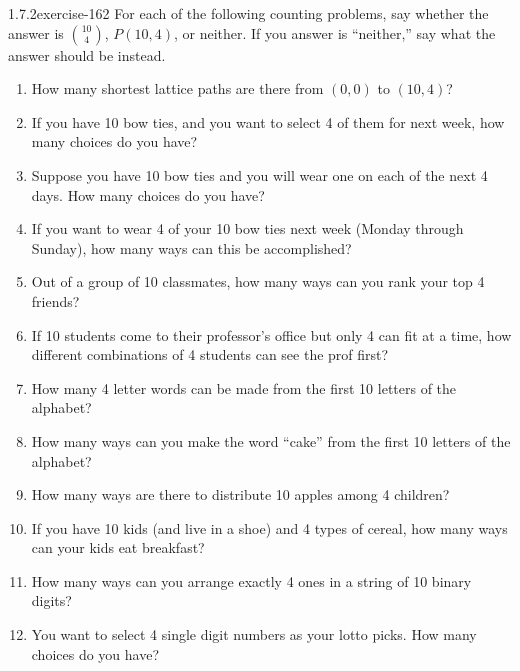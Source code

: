 \documentclass[twoside,11pt,]{book}
\numberwithin{equation}{chapter}
\begin{document}
\begin{divisionsolution}{1.7.2}{}{exercise-162}%
\hypertarget{p-2626}{}%
For each of the following counting problems, say whether the answer is \({10\choose 4}\), \(P(10,4)\), or neither. If you answer is ``neither,'' say what the answer should be instead.\leavevmode%
\begin{enumerate}[label=(\alph*)]
\item\hypertarget{li-1540}{}\hypertarget{p-2627}{}%
How many shortest lattice paths are there from \((0,0)\) to \((10,4)\)?%
\item\hypertarget{li-1541}{}\hypertarget{p-2628}{}%
If you have 10 bow ties,  and you want to select 4 of them for next week, how many choices do you have?%
\item\hypertarget{li-1542}{}\hypertarget{p-2629}{}%
Suppose you have 10 bow ties and you will wear one on each of the next 4 days. How many choices do you have?%
\item\hypertarget{li-1543}{}\hypertarget{p-2630}{}%
If you want to wear 4 of your 10 bow ties next week (Monday through Sunday), how many ways can this be accomplished?%
\item\hypertarget{li-1544}{}\hypertarget{p-2631}{}%
Out of a group of 10 classmates, how many ways can you rank your top 4 friends?%
\item\hypertarget{li-1545}{}\hypertarget{p-2632}{}%
If 10 students come to their professor's office but only 4 can fit at a time, how different combinations of 4 students can see the prof first?%
\item\hypertarget{li-1546}{}\hypertarget{p-2633}{}%
How many 4 letter words can be made from the first 10 letters of the alphabet?%
\item\hypertarget{li-1547}{}\hypertarget{p-2634}{}%
How many ways can you make the word ``cake'' from the first 10 letters of the alphabet?%
\item\hypertarget{li-1548}{}\hypertarget{p-2635}{}%
How many ways are there to distribute 10 apples among 4 children?%
\item\hypertarget{li-1549}{}\hypertarget{p-2636}{}%
If you have 10 kids (and live in a shoe) and 4 types of cereal, how many ways can your kids eat breakfast?%
\item\hypertarget{li-1550}{}\hypertarget{p-2637}{}%
How many ways can you arrange exactly 4 ones in a string of 10 binary digits?%
\item\hypertarget{li-1551}{}\hypertarget{p-2638}{}%
You want to select 4 single digit numbers as your lotto picks. How many choices do you have?%

\end{enumerate}
\end{divisionsolution}
\end{document}
